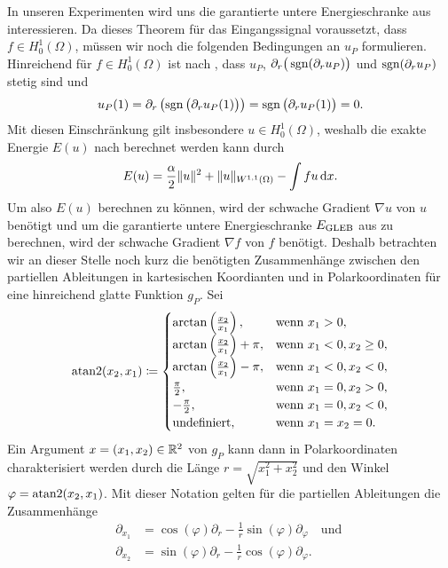 In unseren Experimenten wird uns die garantierte untere Energieschranke aus
 interessieren. 
Da dieses Theorem für das Eingangssignal voraussetzt, dass $f\in
H^1_0(\Omega)$, müssen wir noch die folgenden Bedingungen an $u_P$ formulieren.
Hinreichend für $f\in H^1_0(\Omega)$ ist nach ,
dass  $u_P$, $\partial_r\big(\operatorname{sgn}(\partial_r u_P)\big)$ und $\operatorname{sgn}(\partial_r
u_P)$ stetig sind und 
\begin{align*}
  u_P(1)
  =
  \partial_r\left( \operatorname{sgn}\big(\partial_r u_P(1)\big)\right)
  =
  \operatorname{sgn}\big(\partial_r u_P(1)\big)
  =
  0.
\end{align*}
Mit diesen Einschränkung gilt insbesondere $u\in H^1_0(\Omega)$, weshalb 
die exakte Energie $E(u)$ nach  berechnet werden kann
durch 
\begin{align*}
  E(u)
  =
  \frac{\alpha}{2}\Vert u\Vert^2 + \Vert u\Vert_{W^{1,1}(\Omega)} 
  - \int fu\,\mathrm{d}x.
\end{align*}
Um also $E(u)$ berechnen zu können, wird der schwache Gradient $\nabla u$ von
$u$ benötigt und um die garantierte untere Energieschranke $E_\textup{GLEB}$ aus
 zu berechnen, wird der schwache Gradient $\nabla f$ von $f$
benötigt.
Deshalb betrachten wir an dieser Stelle noch kurz die benötigten
Zusammenhänge zwischen den partiellen Ableitungen in kartesischen Koordianten
und in Polarkoordinaten für eine hinreichend glatte Funktion $g_P$.
Sei
\begin{align*}
  \operatorname{atan2}(x_2,x_1)\coloneqq
  \begin{cases}
    \arctan\left( \frac{x_2}{x_1} \right),& \text{wenn }x_1>0,\\
    \arctan\left( \frac{x_2}{x_1} \right) +\pi,& \text{wenn }x_1<0,x_2\geq 0,\\
    \arctan\left( \frac{x_2}{x_1} \right) -\pi,& \text{wenn }x_1<0,x_2<0,\\
    \frac{\pi}{2},& \text{wenn }x_1=0,x_2>0,\\
    -\frac{\pi}{2},& \text{wenn }x_1=0,x_2<0,\\
    \text{undefiniert},& \text{wenn }x_1=x_2=0.
  \end{cases}
\end{align*}
Ein Argument $x=(x_1,x_2)\in\mathbb{R}^2$ von $g_P$ kann dann in Polarkoordinaten 
charakterisiert werden durch die Länge $r=\sqrt{x_1^2+x_2^2}$ und den Winkel
$\varphi = \operatorname{atan2}(x_2,x_1)$.
Mit dieser Notation gelten für die partiellen Ableitungen die Zusammenhänge
\begin{align*}
  \partial_{x_1} &= 
  \cos(\varphi)\partial_r - \frac{1}{r}\sin(\varphi)\partial_\varphi
  \quad\text{und }\\
  \partial_{x_2} &= 
  \sin(\varphi)\partial_r - \frac{1}{r}\cos(\varphi)\partial_\varphi.
\end{align*}
